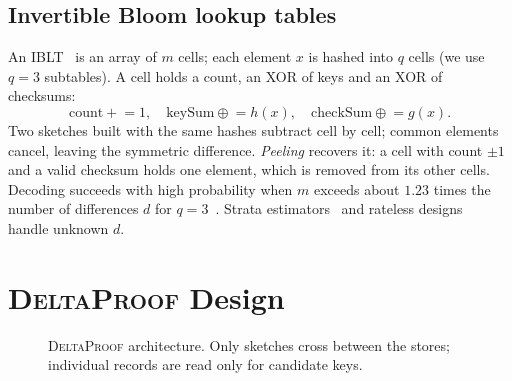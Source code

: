 \documentclass[conference]{IEEEtran}
\newcommand{\sys}{\textsc{DeltaProof}}
\begin{document}
\subsection{Invertible Bloom lookup tables}
An IBLT~\cite{goodrich2011} is an array of $m$ cells; each element $x$ is hashed into $q$ cells (we use $q=3$ subtables). A cell holds a count, an XOR of keys and an XOR of checksums:
\begin{equation}
\mathrm{count} \mathrel{+}= 1,\quad \mathrm{keySum} \mathrel{\oplus}= h(x),\quad \mathrm{checkSum} \mathrel{\oplus}= g(x).
\end{equation}
Two sketches built with the same hashes subtract cell by cell; common elements cancel, leaving the symmetric difference. \emph{Peeling} recovers it: a cell with count $\pm1$ and a valid checksum holds one element, which is removed from its other cells. Decoding succeeds with high probability when $m$ exceeds about $1.23$ times the number of differences $d$ for $q=3$~\cite{goodrich2011,eppstein2011}. Strata estimators~\cite{eppstein2011} and rateless designs~\cite{yang2024} handle unknown $d$.

\section{\sys{} Design}\label{sec:design}
\begin{figure}[t]
\centering
{}
\caption{\sys{} architecture. Only sketches cross between the stores; individual records are read only for candidate keys.}
\label{fig:arch}
\end{figure}
\end{document}
